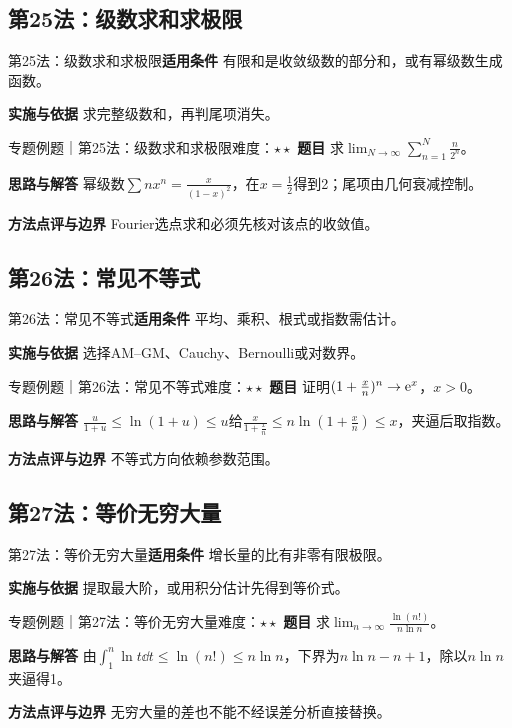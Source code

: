 \subsection{第25法：级数求和求极限}\label{mat:limits_35:k25}
\begin{method}{第25法：级数求和求极限}\textbf{适用条件} 有限和是收敛级数的部分和，或有幂级数生成函数。\par\textbf{实施与依据} 求完整级数和，再判尾项消失。\end{method}
\begin{example}{专题例题｜第25法：级数求和求极限}{难度：$\star\star$}
\textbf{题目} 求$\lim_{N\to\infty}\sum_{n=1}^N\frac{n}{2^n}$。\par\textbf{思路与解答} 幂级数$\sum nx^n=\frac{x}{(1-x)^2}$，在$x=\frac{1}{2}$得到2；尾项由几何衰减控制。\par\textbf{方法点评与边界} Fourier选点求和必须先核对该点的收敛值。
\end{example}
\subsection{第26法：常见不等式}\label{mat:limits_35:k26}
\begin{method}{第26法：常见不等式}\textbf{适用条件} 平均、乘积、根式或指数需估计。\par\textbf{实施与依据} 选择AM--GM、Cauchy、Bernoulli或对数界。\end{method}
\begin{example}{专题例题｜第26法：常见不等式}{难度：$\star\star$}
\textbf{题目} 证明$(1+\frac{x}{n})^n\to\mathrm{e}^x$，$x>0$。\par\textbf{思路与解答} $\frac{u}{1+u}\le\ln(1+u)\le u$给$\frac{x}{1+\frac{x}{n}}\le n\ln(1+\frac{x}{n})\le x$，夹逼后取指数。\par\textbf{方法点评与边界} 不等式方向依赖参数范围。
\end{example}
\subsection{第27法：等价无穷大量}\label{mat:limits_35:k27}
\begin{method}{第27法：等价无穷大量}\textbf{适用条件} 增长量的比有非零有限极限。\par\textbf{实施与依据} 提取最大阶，或用积分估计先得到等价式。\end{method}
\begin{example}{专题例题｜第27法：等价无穷大量}{难度：$\star\star$}
\textbf{题目} 求$\lim_{n\to\infty}\frac{\ln(n!)}{n\ln n}$。\par\textbf{思路与解答} 由$\int_1^n\ln t\dd t\le\ln(n!)\le n\ln n$，下界为$n\ln n-n+1$，除以$n\ln n$夹逼得1。\par\textbf{方法点评与边界} 无穷大量的差也不能不经误差分析直接替换。
\end{example}

